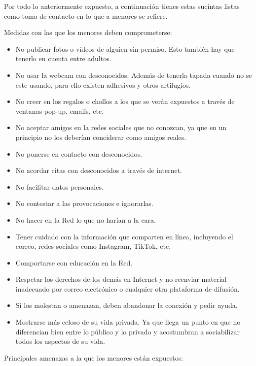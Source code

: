\documentclass[
  spanish,
  a4paper,
  openany]{book}
\begin{document}
Por todo lo anteriormente expuesto, a continuación tienes estas sucintas listas como toma de contacto en lo que a menores se refiere.

Medidas con las que los menores deben comprometerse:

\begin{itemize}
\item
  No publicar fotos o vídeos de alguien sin permiso. Esto también hay que tenerlo en cuenta entre adultos.
\item
  No usar la webcam con desconocidos. Además de tenerla tapada cuando no se este usando, para ello existen adhesivos y otros artilugios.
\item
  No creer en los regalos o chollos a los que se verán expuestos a través de ventanas pop-up, emails, etc.
\item
  No aceptar amigos en la redes sociales que no conozcan, ya que en un principio no los deberían conciderar como amigos reales.
\item
  No ponerse en contacto con desconocidos.
\item
  No acordar citas con desconocidos a través de internet.
\item
  No facilitar datos personales.
\item
  No contestar a las provocaciones e ignorarlas.
\item
  No hacer en la Red lo que no harían a la cara.
\item
  Tener cuidado con la información que comparten en línea, incluyendo el correo, redes sociales como Instagram, TikTok, etc.
\item
  Comportarse con educación en la Red.
\item
  Respetar los derechos de los demás en Internet y no reenviar material inadecuado por correo electrónico o cualquier otra plataforma de difusión.
\item
  Si los molestan o amenazan, deben abandonar la conexión y pedir ayuda.
\item
  Mostrarse más celoso de su vida privada. Ya que llega un punto en que no diferencian bien entre lo público y lo privado y acostumbran a sociabilizar todos los aspectos de su vida.
\end{itemize}

Principales amenazas a la que los menores están expuestos:
\end{document}
